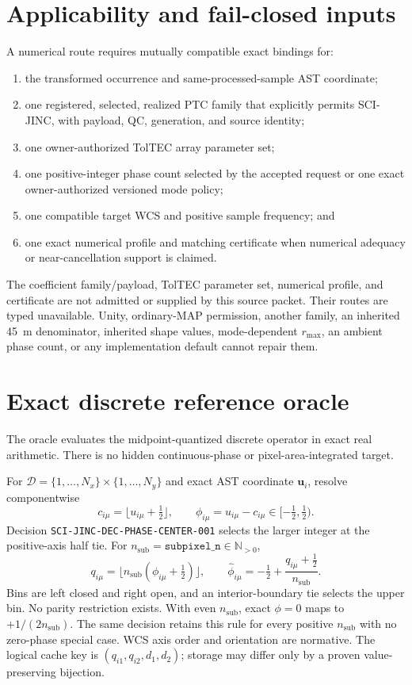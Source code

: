 \documentclass[10pt]{article}
\begin{document}
\section{Applicability and fail-closed inputs}
\label{sec:eng-applicability}

A numerical route requires mutually compatible exact bindings for:

\begin{enumerate}
\item the transformed occurrence and same-processed-sample AST coordinate;
\item one registered, selected, realized PTC family that explicitly permits
SCI-JINC, with payload, QC, generation, and source identity;
\item one owner-authorized TolTEC array parameter set;
\item one positive-integer phase count selected by the accepted request or one
exact owner-authorized versioned mode policy;
\item one compatible target WCS and positive sample frequency; and
\item one exact numerical profile and matching certificate when numerical
adequacy or near-cancellation support is claimed.
\end{enumerate}

The coefficient family/payload, TolTEC parameter set, numerical profile, and
certificate are not admitted or supplied by this source packet.  Their routes
are typed unavailable.  Unity, ordinary-MAP permission, another family, an
inherited 45~m denominator, inherited shape values, mode-dependent
$r_{\max}$, an ambient phase count, or any implementation default cannot
repair them.

\section{Exact discrete reference oracle}
\label{sec:eng-oracle}

The oracle evaluates the midpoint-quantized discrete operator in exact real
arithmetic.  There is no hidden continuous-phase or pixel-area-integrated
target.

For $\mathcal D=\{1,\ldots,N_x\}\times\{1,\ldots,N_y\}$ and exact AST coordinate
$\boldsymbol u_i$, resolve componentwise
\[
 c_{i\mu}=\lfloor u_{i\mu}+\tfrac12\rfloor,\qquad
 \phi_{i\mu}=u_{i\mu}-c_{i\mu}\in[-\tfrac12,\tfrac12).
\]
Decision \texttt{SCI-JINC-DEC-PHASE-CENTER-001} selects the larger integer
at the positive-axis half tie.  For
$n_{\mathrm{sub}}=\texttt{subpixel\_n}\in\mathbb N_{>0}$,
\[
 q_{i\mu}=\lfloor n_{\mathrm{sub}}(\phi_{i\mu}+\tfrac12)\rfloor,\qquad
 \widehat\phi_{i\mu}=-\tfrac12+
 \frac{q_{i\mu}+\tfrac12}{n_{\mathrm{sub}}}.
\]
Bins are left closed and right open, and an interior-boundary tie selects the
upper bin.  No parity restriction exists.  With even $n_{\mathrm{sub}}$, exact
$\phi=0$ maps to $+1/(2n_{\mathrm{sub}})$.  The same decision retains this
rule for every positive $n_{\mathrm{sub}}$ with no zero-phase special case.
WCS axis order and orientation are
normative.  The logical cache key is
$(q_{i1},q_{i2},d_1,d_2)$; storage may differ only by a proven
value-preserving bijection.
\end{document}
